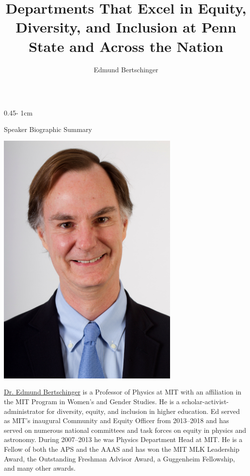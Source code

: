 \documentclass{../psuposter}
\title{Departments That Excel in Equity, Diversity, and Inclusion at Penn State and Across the Nation}
\author{Edmund Bertschinger}
\institute{Massachusetts Institute of Technology}
\begin{document}
\begin{frame}
\begin{columns}[t, totalwidth=\textwidth]
\begin{column}{0.45\textwidth - 1cm}


    \begin{block}{Speaker Biographic Summary}
    	\begin{center}
    		\includegraphics[width=0.68\textwidth]{images/portrait}
    	\end{center}
    	\href{https://web.mit.edu/physics/people/faculty/bertschinger_edmund.html}{Dr. Edmund Bertschinger} is a Professor of Physics at MIT with an affiliation in the MIT Program in Women’s and Gender Studies. He is a scholar-activist-administrator for diversity, equity, and inclusion in higher education. Ed served as MIT’s inaugural Community and Equity Officer from 2013–2018 and has served on numerous national committees and task forces on equity in physics and astronomy. During 2007–2013 he was Physics Department Head at MIT. He is a Fellow of both the APS and the AAAS and has won the MIT MLK Leadership Award, the Outstanding Freshman Advisor Award, a Guggenheim Fellowship, and many other awards.
    \end{block}



\end{column}
\end{columns}
\end{frame}
\end{document}
